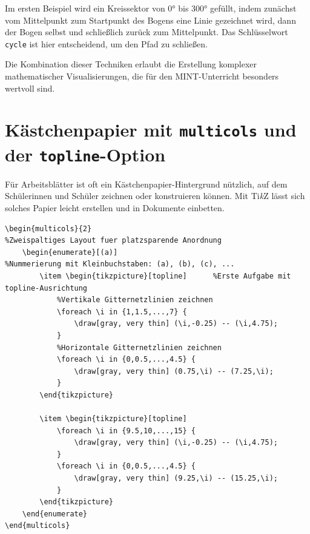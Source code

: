 Im ersten Beispiel wird ein Kreissektor von 0° bis 300° gefüllt, indem zunächst vom Mittelpunkt zum Startpunkt des Bogens eine Linie gezeichnet wird, dann der Bogen selbst und schließlich zurück zum Mittelpunkt. Das Schlüsselwort \texttt{cycle} ist hier entscheidend, um den Pfad zu schließen.

Die Kombination dieser Techniken erlaubt die Erstellung komplexer mathematischer Visualisierungen, die für den MINT-Unterricht besonders wertvoll sind.


\section{Kästchenpapier mit \texttt{multicols} und der \texttt{topline}-Option}

Für Arbeitsblätter ist oft ein Kästchenpapier-Hintergrund nützlich, auf dem Schülerinnen und Schüler zeichnen oder konstruieren können. Mit Ti\textit{k}Z lässt sich solches Papier leicht erstellen und in Dokumente einbetten.

\begin{lstlisting}[style=latex]
\begin{multicols}{2}											%Zweispaltiges Layout fuer platzsparende Anordnung
	\begin{enumerate}[(a)]									%Nummerierung mit Kleinbuchstaben: (a), (b), (c), ...
		\item \begin{tikzpicture}[topline]   	%Erste Aufgabe mit topline-Ausrichtung
			%Vertikale Gitternetzlinien zeichnen
			\foreach \i in {1,1.5,...,7} {
				\draw[gray, very thin] (\i,-0.25) -- (\i,4.75);
			}
			%Horizontale Gitternetzlinien zeichnen
			\foreach \i in {0,0.5,...,4.5} {
				\draw[gray, very thin] (0.75,\i) -- (7.25,\i);
			}
		\end{tikzpicture}

		\item \begin{tikzpicture}[topline]
			\foreach \i in {9.5,10,...,15} {
				\draw[gray, very thin] (\i,-0.25) -- (\i,4.75);
			}
			\foreach \i in {0,0.5,...,4.5} {
				\draw[gray, very thin] (9.25,\i) -- (15.25,\i);
			}
		\end{tikzpicture}
	\end{enumerate}
\end{multicols}
\end{lstlisting}

